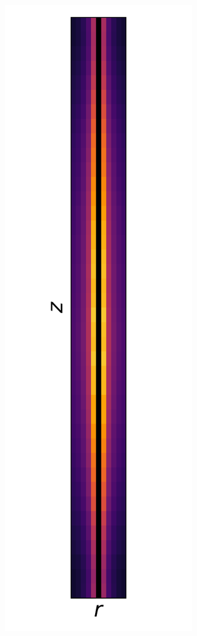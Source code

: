 \documentclass[fleqn]{beamer}
\begin{document}
\begin{frame}
\begin{columns}[c]
\begin{column}{.5\textwidth}
\begin{figure}
\includegraphics[height = 0.8\textheight]{rr_dist_B1}

\end{figure}
\end{column}
\end{columns}
\end{frame}
\end{document}
